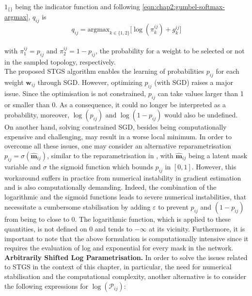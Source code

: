 $1_{\{\}}$ being the indicator function and following
\cref{eqn:chap2:gumbel-softmax-argmax}, $q_{ij}$ is\\

\begin{equation}
  \label{eqn:chap2:q_ij_expression}
  q_{ij} = {\text{argmax}_{k \in \{1,2\}}}\big[\log(\pi_k^{ij})+g_k^{ij}\big]
\end{equation}\\

with $\pi^{ij}_1 = p_{ij}$ and $\pi^{ij}_2 = 1-p_{ij}$, the probability for a
weight to be selected or not in the sampled topology, respectively.\\

The proposed \ac{STGS} algorithm enables the learning of probabilities
$p_{ij}$ for each weight $\bm{w}_{ij}$ through \ac{SGD}. However, optimizing
$p_{ij}$ (with \ac{SGD}) raises a major issue. Since the optimisation is not
constrained, $p_{ij}$ can take values larger than 1 or smaller than 0. As a
consequence, it could no longer be interpreted as a probability, moreover,
$\log(p_{ij})$ and $\log(1-p_{ij})$ would also be undefined.\\

On another hand, solving constrained SGD, besides being computationally
expensive and challenging, may result in a worse local minimum. In order to
overcome all these issues, one may consider an alternative reparametrisation
$p_{ij}=\sigma(\bm{\hat{m}}_{ij})$, similar to the reparametrisation in
\cite{DBLP:conf/nips/ZhouLLY19}, with $\bm{\hat{m}}_{ij}$ being a latent mask
variable and $\sigma$ the sigmoid function which bounds $p_{ij}$ in $[0,1]$.
However, this workaround suffers in practice from numerical instability in
gradient estimation and is also computationally demanding. Indeed, the
combination of the logarithmic and the sigmoid functions leads to severe
numerical instabilities, that necessitate a cumbersome stabilisation by adding
$\varepsilon$ to prevent $p_{ij}$ and $(1-p_{ij})$ from being to close to 0. The
logarithmic function, which is applied to these quantities, is not defined on 0
and tends to $-\infty$ at its vicinity. Furthermore, it is important to note
that the above formulation is computationally intensive since it requires the
evaluation of log and exponential for every mask in the network.\\


\noindent\textbf{Arbitrarily Shifted Log Parametrisation.} In order to solve the
issues related to \ac{STGS} in the context of this chapter, in particular, the
need for numerical stabilisation and the computational complexity, another
alternative is to consider the following expressions for
$\log(\mathcal{P}_{ij})$:\\


